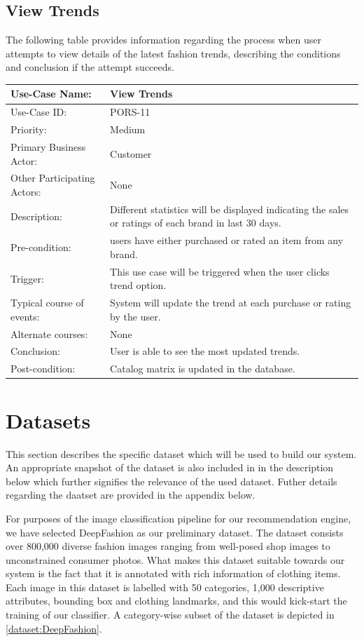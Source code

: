 \subsection{View Trends}
The following table provides information regarding the process when user attempts to view details of the latest fashion trends, describing the conditions and conclusion if the attempt succeeds. 
\begin{center}
    \begin{tabular}{ @{}|p{5cm}||p{7cm}|  }
    \hline
    Use-Case Name: & View Trends \\ \hline
    Use-Case ID: & PORS-11 \\ \hline
    Priority: & Medium \\ \hline
    Primary Business Actor: & Customer \\ \hline
    Other Participating Actors: & None \\ \hline
    Description: & Different statistics will be displayed indicating the sales or ratings of each brand in last 30 days.  \\ \hline
    Pre-condition: &  users have either purchased or rated an item from any brand.\\ \hline
    Trigger: &  This use case will be triggered when the user clicks trend option. \\ \hline
    Typical course of events: & System will update the trend at each purchase or rating by the user. \\ \hline
    Alternate courses: & None\\ \hline
    Conclusion: &  User is able to see the most updated trends. \\ \hline
    Post-condition: &  Catalog matrix is updated in the database.\\ \hline
    \end{tabular}
\end{center}

\section{Datasets}
This section describes the specific dataset which will be used to build our system. An appropriate snapshot of the dataset is also included in in the description below which further signifies the relevance of the used dataset. Futher details regarding the daatset are provided in the appendix below.

For purposes of the image classification pipeline for our recommendation engine, we have selected DeepFashion \cite{DeepFashion} as our preliminary dataset. The dataset consists over 800,000 diverse fashion images ranging from well-posed shop images to unconstrained consumer photos. What makes this dataset suitable towards our system is the fact that it is annotated with rich information of clothing items. Each image in this dataset is labelled with 50 categories, 1,000 descriptive attributes, bounding box and clothing landmarks, and this would kick-start the training of our classifier. A category-wise subset of the dataset is depicted in \autoref{dataset:DeepFashion}. 


